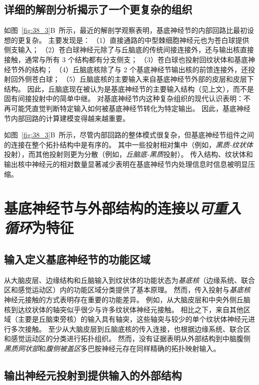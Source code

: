 \subsection{详细的解剖分析揭示了一个更复杂的组织}

如图~\ref{fig:38_3}B~所示，最近的解剖学观察表明，基底神经节的内部回路比最初设想的更复杂。
主要发现是：
（1）直接通路的中型棘细胞神经元也为苍白球提供侧支输入； 
（2）苍白球神经元除了与丘脑底的传统间接连接外，还与输出核直接接触，通常与所有 3 个结构都有分支侧支；
（3）苍白球也投射回纹状体和基底神经节外的结构；
（4）丘脑底核除了与 2 个基底神经节输出核的前馈连接外，还投射回外侧苍白球；
（5）丘脑底核的主要输入来自基底神经节外部的皮层和皮层下结构。
因此，丘脑底现在被认为是基底神经节的主要输入结构（见上文），而不是固有间接投射中的简单中继。
对基底神经节内这种复杂组织的现代认识表明：不再可能凭直觉判断特定输入如何被基底神经节转化为特定输出。
因此，基底神经节内部回路的计算建模变得越来越重要。


如图~\ref{fig:38_3}B~所示，尽管内部回路的整体模式很复杂，但基底神经节组件之间的连接在整个拓扑结构中是有序的。
其中一些投射相对集中（例如，\textit{黑质-纹状体}投射），而其他投射则更为分散（例如，\textit{丘脑底-黑质}投射）。
传入结构、纹状体和输出核中神经元的相对数量显著减少表明在基底神经节内处理信息时信息被明显压缩。



\section{基底神经节与外部结构的连接以\textit{可重入循环}为特征}

\subsection{输入定义基底神经节的功能区域}

从大脑皮层、边缘结构和丘脑输入到纹状体的功能状态为\textit{基底核}（边缘系统、联合区和感觉运动区）内的功能区域分类提供了基本原理。
然而，传入投射与\textit{基底核}神经元接触的方式表明存在重要的功能差异。
例如，从大脑皮层和中央外侧丘脑核到达纹状体的轴突似乎很少与许多纹状体神经元接触。
相比之下，来自其他区域（主要是丘脑束旁核）的输入具有轴突，这些轴突与较少的单个纹状体神经元进行多次接触。
至少从大脑皮层到丘脑底核的传入连接，也根据边缘系统、联合区和感觉运动区的分类进行拓扑组织。
然而，没有证据表明从外部结构到中脑腹侧\textit{黑质网状部}和\textit{腹侧被盖区}多巴胺神经元存在同样精确的拓扑映射输入。



\subsection{输出神经元投射到提供输入的外部结构}

